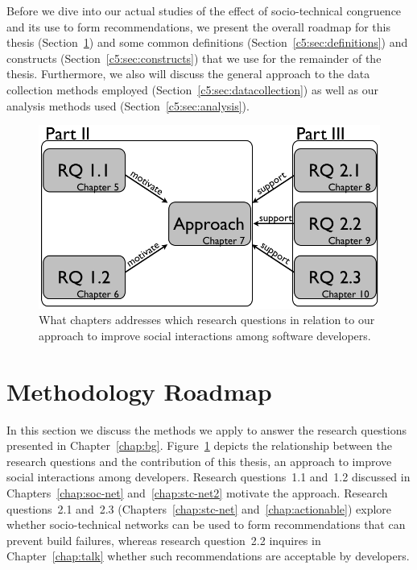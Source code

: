 \label{chap:meth}
Before we dive into our actual studies of the effect of socio-technical congruence and its use to form recommendations, we present the overall roadmap for this thesis (Section~\ref{c5:sec:roadmap}) and some common definitions (Section~\ref{c5:sec:definitions}) and constructs (Section~\ref{c5:sec:constructs}) that we use for the remainder of the thesis.
Furthermore, we also will discuss the general approach to the data collection methods employed (Section~\ref{c5:sec:datacollection}) as well as our analysis methods used (Section~\ref{c5:sec:analysis}).

\begin{figure}[t]
\centering
\includegraphics[width=.8\columnwidth]{./figures/roadmap}
\caption{What chapters addresses which research questions in relation to our approach to improve social interactions among software developers.}
\label{fig:roadmap}
\end{figure}

\section{Methodology Roadmap}
\label{c5:sec:roadmap}
In this section we discuss the methods we apply to answer the research questions presented in Chapter~\ref{chap:bg}.
Figure~\ref{fig:roadmap} depicts the relationship between the research questions and the contribution of this thesis, an approach to improve social interactions among developers.
Research questions~1.1 and~1.2 discussed in Chapters~\ref{chap:soc-net} and~\ref{chap:stc-net2} motivate the approach.
Research questions~2.1 and~2.3 (Chapters~\ref{chap:stc-net} and~\ref{chap:actionable}) explore whether socio-technical networks can be used to form recommendations that can prevent build failures, whereas research question~2.2 inquires in Chapter~\ref{chap:talk} whether such recommendations are acceptable by developers.

